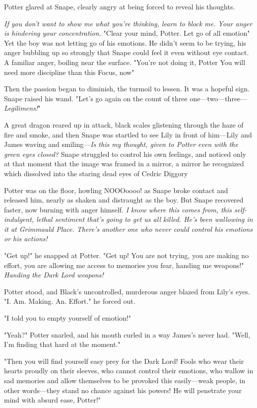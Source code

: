 Potter glared at Snape, clearly angry at being forced to reveal his thoughts.

\emph{If you don't want to show me what you're thinking, learn to block me. Your anger is hindering your concentration.} "Clear your mind, Potter. Let go of all emotion{\el}" Yet the boy was not letting go of his emotions. He didn't seem to be trying, his anger bubbling up so strongly that Snape could feel it even without eye contact. A familiar anger, boiling near the surface. "You're not doing it, Potter{\el} You will need more discipline than this{\el} Focus, now{\el}"

Then the passion began to diminish, the turmoil to lessen. It was a hopeful sign. Snape raised his wand. "Let's go again{\el} on the count of three{\el} one—two—three—\emph{Legilimens!}"

A great dragon reared up in attack, black scales glistening through the haze of fire and smoke, and then{\el} Snape was startled to see Lily in front of him—Lily and James waving and smiling—\emph{Is this my thought, given to Potter even with the green eyes closed?} Snape struggled to control his own feelings, and noticed only at that moment that the image was framed in a mirror, a mirror he recognized{\el} which dissolved into the staring dead eyes of Cedric Diggory{\el}

Potter was on the floor, howling NOOOoooo! as Snape broke contact and released him, nearly as shaken and distraught as the boy. But Snape recovered faster, now burning with anger himself. \emph{I know where this comes from, this self-indulgent, lethal sentiment that's going to get us all killed. He's been wallowing in it at Grimmauld Place. There's another one who never could control his emotions or his actions!}

"Get up!" he snapped at Potter. "Get up! You are not trying, you are making no effort, you are allowing me access to memories you fear, handing me weapons!" \emph{Handing the Dark Lord weapons!}

Potter stood, and Black's uncontrolled, murderous anger blazed from Lily's eyes. "I. Am. Making. An. Effort." he forced out.

"I told you to empty yourself of emotion!"

"Yeah?" Potter snarled, and his mouth curled in a way James's never had. "Well, I'm finding that hard at the moment."

"Then you will find yourself easy prey for the Dark Lord! Fools who wear their hearts proudly on their sleeves, who cannot control their emotions, who wallow in sad memories and allow themselves to be provoked this easily—weak people, in other words—they stand no chance against his powers! He will penetrate your mind with absurd ease, Potter!"

